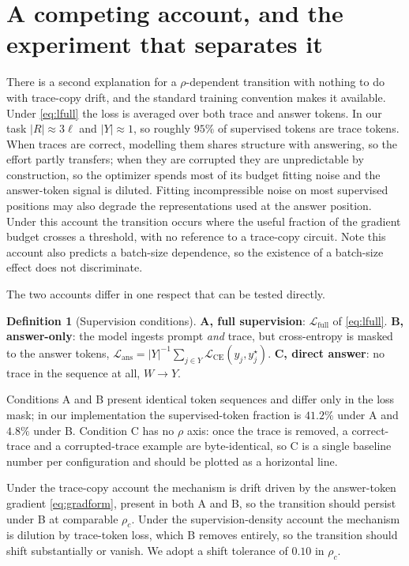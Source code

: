 \documentclass{article}
\theoremstyle{plain}
\theoremstyle{definition}
\newtheorem{definition}{Definition}
\theoremstyle{remark}
\newcommand{\1}{\mathbf{1}}
\newcommand{\cL}{\mathcal{L}}
\begin{document}
\section{A competing account, and the experiment that separates it}
\label{sec:competing}

There is a second explanation for a $\rho$-dependent transition with nothing to
do with trace-copy drift, and the standard training convention makes it
available. Under \eqref{eq:lfull} the loss is averaged over both trace and answer
tokens. In our task $|R|\approx3\ell$ and $|Y|\approx1$, so roughly $95\%$ of
supervised tokens are trace tokens. When traces are correct, modelling them
shares structure with answering, so the effort partly transfers; when they are
corrupted they are unpredictable by construction, so the optimizer spends most of
its budget fitting noise and the answer-token signal is diluted. Fitting
incompressible noise on most supervised positions may also degrade the
representations used at the answer position. Under this account the transition
occurs where the useful fraction of the gradient budget crosses a threshold, with
no reference to a trace-copy circuit. Note this account also predicts a
batch-size dependence, so the existence of a batch-size effect does not
discriminate.

The two accounts differ in one respect that can be tested directly.

\begin{definition}[Supervision conditions]
\label{def:conditions}
\textbf{A, full supervision}: $\cL_{\mathrm{full}}$ of \eqref{eq:lfull}.
\textbf{B, answer-only}: the model ingests prompt \emph{and} trace, but
cross-entropy is masked to the answer tokens,
$\cL_{\mathrm{ans}} = |Y|^{-1}\sum_{j\in Y}\cL_{\mathrm{CE}}(y_j,y_j^\star)$.
\textbf{C, direct answer}: no trace in the sequence at all, $W\to Y$.
\end{definition}

Conditions A and B present identical token sequences and differ only in the loss
mask; in our implementation the supervised-token fraction is $41.2\%$ under A and
$4.8\%$ under B. Condition C has no $\rho$ axis: once the trace is removed, a
correct-trace and a corrupted-trace example are byte-identical, so C is a single
baseline number per configuration and should be plotted as a horizontal line.

Under the trace-copy account the mechanism is drift driven by the answer-token
gradient \eqref{eq:gradform}, present in both A and B, so the transition should
persist under B at comparable $\rho_c$. Under the supervision-density account the
mechanism is dilution by trace-token loss, which B removes entirely, so the
transition should shift substantially or vanish. We adopt a shift tolerance of
$0.10$ in $\rho_c$.
\end{document}
